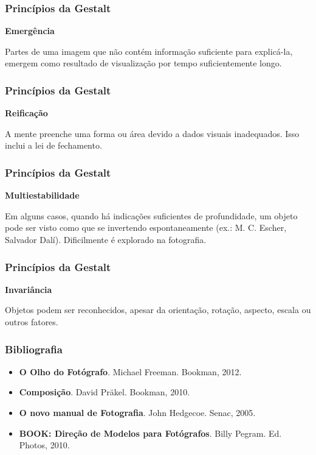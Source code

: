 \begin{frame}
    \frametitle{Princípios da Gestalt}
    {\textbf{\large Emergência}}
    \vspace{1cm}

    Partes de uma imagem que não contém informação suficiente para explicá-la,
    emergem como resultado de visualização por tempo suficientemente longo.
\end{frame}

\begin{frame}
  \frametitle{Princípios da Gestalt}
  {\textbf{\large Reificação}}
  \vspace{1cm}

  A mente preenche uma forma ou área devido a dados visuais inadequados. Isso
  inclui a lei de fechamento.
\end{frame}

\begin{frame}
  \frametitle{Princípios da Gestalt}
  {\textbf{\large Multiestabilidade}}
  \vspace{1cm}

  Em alguns casos, quando há indicações suficientes de profundidade, um objeto
  pode ser visto como que se invertendo espontaneamente (ex.: M. C. Escher,
  Salvador Dalí). Dificilmente é explorado na fotografia.
\end{frame}

\begin{frame}
  \frametitle{Princípios da Gestalt}
  {\textbf{\large Invariância}}
  \vspace{1cm}

  Objetos podem ser reconhecidos, apesar da orientação, rotação, aspecto, escala
  ou outros fatores.
\end{frame}



\begin{frame}
    \frametitle{Bibliografia}
    \begin{itemize}
      \item \textbf{O Olho do Fotógrafo}. Michael Freeman. Bookman, 2012.
      \item \textbf{Composição}. David Präkel. Bookman, 2010.
      \item \textbf{O novo manual de Fotografia}. John Hedgecoe. Senac, 2005.
      \item \textbf{BOOK: Direção de Modelos para Fotógrafos}. Billy Pegram. Ed. Photos, 2010.
    \end{itemize}
\end{frame}


